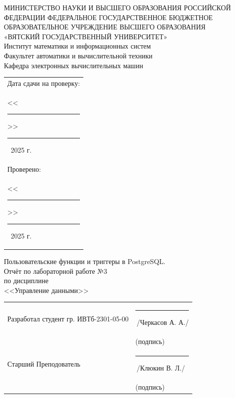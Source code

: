 \documentclass[oneside,a4paper,14pt]{extarticle}
\begin{document}
\newpage
\thispagestyle{empty}
\begin{center}
  МИНИСТЕРСТВО НАУКИ И ВЫСШЕГО ОБРАЗОВАНИЯ РОССИЙСКОЙ ФЕДЕРАЦИИ ФЕДЕРАЛЬНОЕ ГОСУДАРСТВЕННОЕ БЮДЖЕТНОЕ ОБРАЗОВАТЕЛЬНОЕ УЧРЕЖДЕНИЕ ВЫСШЕГО ОБРАЗОВАНИЯ\\
  «ВЯТСКИЙ ГОСУДАРСТВЕННЫЙ УНИВЕРСИТЕТ»\\
  Институт математики и информационных систем\\
  Факультет автоматики и вычислительной техники\\
  Кафедра электронных вычислительных машин
\end{center}
\vspace{10mm}

\hfill
\begin{tabular}{l}
  \footnotesize Дата сдачи на проверку:                                          \\
  \footnotesize <<\rule[-1mm]{5mm}{0.10mm}\/>>\rule[-1mm]{20mm}{0.10mm}\ 2025 г. \\
  \footnotesize Проверено:                                                       \\
  \footnotesize <<\rule[-1mm]{5mm}{0.10mm}\/>>\rule[-1mm]{20mm}{0.10mm}\ 2025 г. \\
\end{tabular}
\vfill

\begin{center}
  Пользовательские функции и триггеры в PostgreSQL.\\
  Отчёт по лабораторной работе №3\\
  по дисциплине\\
  <<Управление данными>>\\
\end{center}
\vspace{25mm}
\noindent
\begin{tabular}{ll}
  Разработал студент гр. ИВТб-2301-05-00 & \hspace{18mm}\rule[-1mm]{30mm}{0.10mm}\,/Черкасов А. А./ \\
                                         & \hspace{25.5mm}\footnotesize(подпись)                    \\
  Старший Преподователь                  & \hspace{18mm}\rule[-1mm]{30mm}{0.10mm}\,/Клюкин В. Л./   \\
                                         & \hspace{25.5mm}\footnotesize(подпись)                    \\
\end{tabular}
\end{document}
